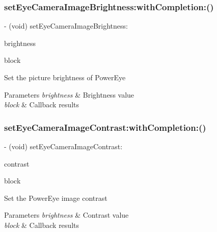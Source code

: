 \subsubsection{\texorpdfstring{set\+Eye\+Camera\+Image\+Brightness\+:with\+Completion\+:()}{setEyeCameraImageBrightness:withCompletion:()}}
{\footnotesize\ttfamily -\/ (void) set\+Eye\+Camera\+Image\+Brightness\+: \begin{DoxyParamCaption}\item[{(N\+S\+Integer)}]{brightness }\item[{withCompletion:(P\+V\+Completion\+Block)}]{block }\end{DoxyParamCaption}}

Set the picture brightness of Power\+Eye


\begin{DoxyParams}{Parameters}
{\em brightness} & Brightness value \\
\hline
{\em block} & Callback results \\
\hline
\end{DoxyParams}
\mbox{\label{interface_p_v_eye_camera_a7773d15d09dfb8b7c85a8677034e3a7b}} 
\subsubsection{\texorpdfstring{set\+Eye\+Camera\+Image\+Contrast\+:with\+Completion\+:()}{setEyeCameraImageContrast:withCompletion:()}}
{\footnotesize\ttfamily -\/ (void) set\+Eye\+Camera\+Image\+Contrast\+: \begin{DoxyParamCaption}\item[{(N\+S\+Integer)}]{contrast }\item[{withCompletion:(P\+V\+Completion\+Block)}]{block }\end{DoxyParamCaption}}

Set the Power\+Eye image contrast


\begin{DoxyParams}{Parameters}
{\em brightness} & Contrast value \\
\hline
{\em block} & Callback results \\
\hline
\end{DoxyParams}
\mbox{\label{interface_p_v_eye_camera_ab1a7bf35cd7079d0825305f6cdeb118a}} 
